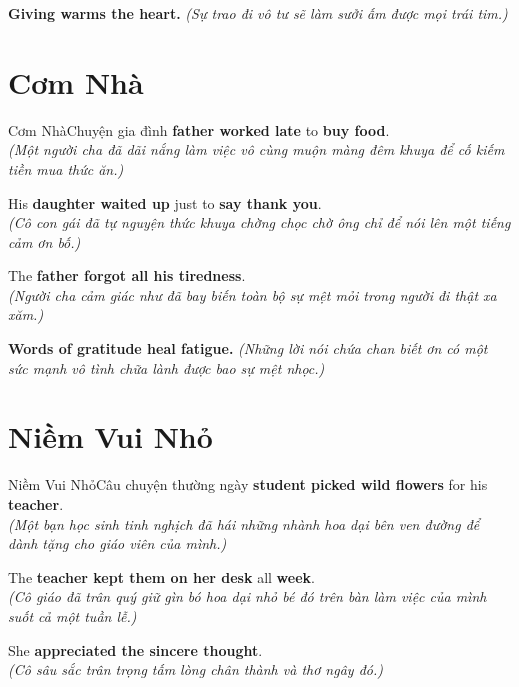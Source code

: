\begin{baihoc}
  \textbf{Giving warms the heart.} \textit{(Sự trao đi vô tư sẽ làm sưởi ấm được mọi trái tim.)}
\end{baihoc}

\vspace{0.8cm}

\ngayDay{}
\section{Cơm Nhà}
\begin{truyen}{Cơm Nhà}{Chuyện gia đình}
 \textbf{father worked late} to \textbf{buy food}.\\
\textit{(Một người cha đã dãi nắng làm việc vô cùng muộn màng đêm khuya để cố kiếm tiền mua thức ăn.)}

His \textbf{daughter waited up} just to \textbf{say thank you}.\\
\textit{(Cô con gái đã tự nguyện thức khuya chờng chọc chờ ông chỉ để nói lên một tiếng cảm ơn bố.)}

The \textbf{father forgot all his tiredness}.\\
\textit{(Người cha cảm giác như đã bay biến toàn bộ sự mệt mỏi trong người đi thật xa xăm.)}
\end{truyen}

\begin{baihoc}
  \textbf{Words of gratitude heal fatigue.} \textit{(Những lời nói chứa chan biết ơn có một sức mạnh vô tình chữa lành được bao sự mệt nhọc.)}
\end{baihoc}

\vspace{0.8cm}

\ngayDay{}
\section{Niềm Vui Nhỏ}
\begin{truyen}{Niềm Vui Nhỏ}{Câu chuyện thường ngày}
 \textbf{student picked wild flowers} for his \textbf{teacher}.\\
\textit{(Một bạn học sinh tinh nghịch đã hái những nhành hoa dại bên ven đường để dành tặng cho giáo viên của mình.)}

The \textbf{teacher kept them on her desk} all \textbf{week}.\\
\textit{(Cô giáo đã trân quý giữ gìn bó hoa dại nhỏ bé đó trên bàn làm việc của mình suốt cả một tuần lễ.)}

She \textbf{appreciated the sincere thought}.\\
\textit{(Cô sâu sắc trân trọng tấm lòng chân thành và thơ ngây đó.)}
\end{truyen}

